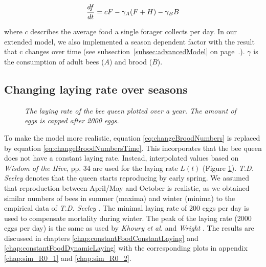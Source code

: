 	\begin{equation}\label{eq:changeFoodStoreConst}
		{df \over dt} = c F - \gamma_A (F+H) - \gamma_B B
	\end{equation}
         
	where $c$ describes the average food a single forager collects per day. In our extended model, we also implemented a season dependent factor with the result that c changes over time (see subsection~\ref{subsec:advancedModel} on page~\pageref{subsec:advancedModel}.). $\gamma$ is the consumption of adult bees ($A$) and brood ($B$).

	\subsection{Changing laying rate over seasons}
		\begin{figure}
			\centering
			\caption{\textit{The laying rate of the bee queen plotted over a year. The amount of eggs is capped after 2000 eggs. }}
			\label{fig:dynLayingRate}
		\end{figure}
		
		To make the model more realistic, equation \ref{eq:changeBroodNumbers} is replaced by equation \ref{eq:changeBroodNumbersTime}. This incorporates that the bee queen does not have a constant laying rate. Instead, interpolated values based on \textit{Wisdom of the Hive}, pp. 34 \cite{seeley95} are used for the laying rate $L(t)$ (Figure \ref{fig:dynLayingRate}). \textit{T.D. Seeley} denotes that the queen starts reproducing by early spring. We assumed that reproduction between April/May and October is realistic, as we obtained similar numbers of bees in summer (maxima) and winter (minima) to the empirical data of \textit{T.D. Seeley} \cite{seeley95}. The minimal laying rate of 200 eggs per day is used to compensate mortality during winter. The peak of the laying rate (2000 eggs per day) is the same as used by \textit{Khoury et al.} \cite{khoury13} and \textit{Wright} \cite{wright08}. The results are discussed in chapters \ref{chap:constantFoodConstantLaying} and \ref{chap:constantFoodDynamicLaying} with the corresponding plots in appendix \ref{chap:sim_R0_1} and \ref{chap:sim_R0_2}.
		
